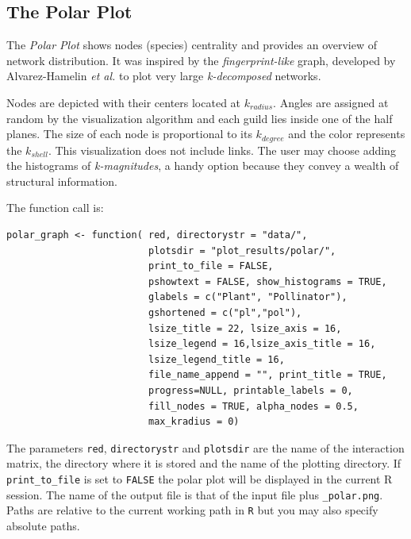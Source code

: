 \documentclass[11pt]{article}
\begin{document}
\clearpage
\subsection*{The Polar Plot}
\label{polar_plot}

The \textit{Polar Plot} shows nodes (species) centrality and provides an overview of network distribution. It was inspired by the \textit{fingerprint-like} graph, developed by Alvarez-Hamelin \textit{et al.} \cite{alvarez2005k} to plot very large \textit{k-decomposed} networks.

Nodes are depicted with their centers located at $k_{radius}$. Angles are assigned at random by the visualization algorithm and each guild lies inside one of the half planes. The size of each node is proportional to its $k_{degree}$ and the color represents the $k_{shell}$. This visualization does not include links. The user may choose adding the histograms of \textit{k-magnitudes}, a handy option because they convey a wealth of structural information.


\noindent The function call is:

\fontsize{3.5mm}{3.5mm}\selectfont
\begin{verbatim}
polar_graph <- function( red, directorystr = "data/", 
                         plotsdir = "plot_results/polar/", 
                         print_to_file = FALSE,     
                         pshowtext = FALSE, show_histograms = TRUE, 
                         glabels = c("Plant", "Pollinator"),
                         gshortened = c("pl","pol"),
                         lsize_title = 22, lsize_axis = 16,
                         lsize_legend = 16,lsize_axis_title = 16, 
                         lsize_legend_title = 16,
                         file_name_append = "", print_title = TRUE,
                         progress=NULL, printable_labels = 0, 
                         fill_nodes = TRUE, alpha_nodes = 0.5,
                         max_kradius = 0)
\end{verbatim}
\normalsize

The parameters \texttt{red}, \texttt{directorystr} and \texttt{plotsdir} are the name of the interaction matrix, the directory where it is stored and the name of the plotting directory. If \texttt{print\_to\_file} is set to \texttt{FALSE} the polar plot will be displayed in the current R session. The name of the output file is that of the input file
plus \texttt{\_polar.png}. Paths are relative to the current working path in \texttt{R} but you may also specify absolute paths.
\end{document}
